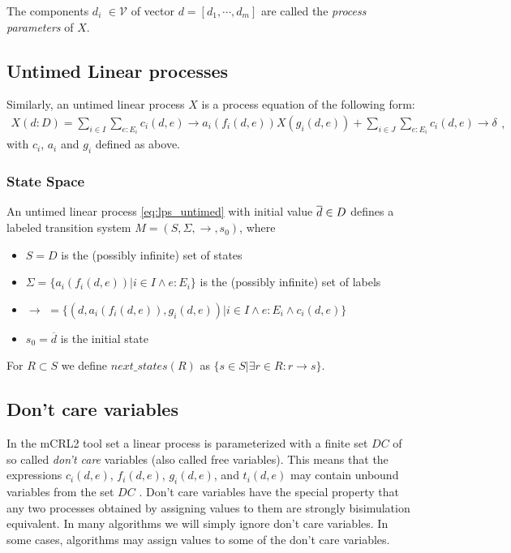 \documentclass{article}
\begin{document}
The components $d_{i}$ $\in \mathcal{V}$ of vector $d=[d_{1},\cdots ,d_{m}]$
are called the \emph{process parameters} of $X$.

\subsection{Untimed Linear processes}

Similarly, an untimed linear process $X$ is a process equation of the
following form:%
\begin{equation}
\begin{array}{l}
X(d:D)=\sum\limits_{i\in I}\sum\limits_{e:E_{i}}c_{i}(d,e)\rightarrow
a_{i}(f_{i}(d,e))X(g_{i}(d,e))+\sum\limits_{i\in
J}\sum\limits_{e:E_{i}}c_{i}(d,e)\rightarrow \delta%
\end{array}%
,  \label{eq:lps_untimed}
\end{equation}%
with $c_{i}$, $a_{i}$ and $g_{i}$ defined as above.

\subsubsection{State Space}

An untimed linear process \ref{eq:lps_untimed} with initial value $\overline{%
d}\in D$ defines a labeled transition system $M=(S,\Sigma ,\rightarrow
,s_{0})$, where

\begin{itemize}
\item $S=D$ is the (possibly infinite) set of states

\item $\Sigma =\{a_{i}(f_{i}(d,e))|i\in I\wedge e:E_{i}\}$ is the (possibly
infinite) set of labels

\item $\rightarrow $ $=\{(d,a_{i}(f_{i}(d,e)),g_{i}(d,e))|i\in I\wedge
e:E_{i}\wedge c_{i}(d,e)\}$

\item $s${}$_{0}=\overline{d}$ is the initial state
\end{itemize}

For $R\subset S$ we define $next\_states(R)$ as $\{s\in S|\exists r\in
R:r\rightarrow s\}$.

\subsection{Don't care variables}

\bigskip In the mCRL2 tool set a linear process is parameterized with a
finite set $DC$ of so called \emph{don't care} variables (also called free
variables). This means that the expressions $c_{i}(d,e)$, $f_{i}(d,e)$, $%
g_{i}(d,e)$, and $t_{i}(d,e)$ may contain unbound variables from the set $DC$%
. Don't care variables have the special property that any two processes
obtained by assigning values to them are strongly bisimulation equivalent.
In many algorithms we will simply ignore don't care variables. In some
cases, algorithms may assign values to some of the don't care variables.
\end{document}
